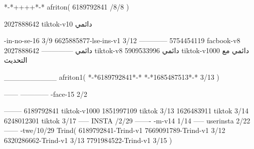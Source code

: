 *-*++++*-*
afriton(
6189792841 /8/8
)

2027888642 tiktok-v10
دائمي

-in-no-se-16 3/9
6625885877-lse-ins-v1 3/12
------------
5754454119 facbook-v8
دائمي
--------------
2027888642 tiktok-v8
دائمي
5909533996 tiktok-v1000
دائمي مع التحديث

__________
afriton1(
*-*6189792841*-*
*-*1685487513*-* 3/13
)


------
------------
-face-15 2/2

--------
6189792841 tiktok-v1000
1851997109 tiktok 3/13
1626483911 tiktok 3/14
6248012301 tiktok 3/17
-----
 INSTA /2/29
-------
-m-v14 1/14
-----
userinsta 2/22
------
-twe/10/29
Trind(
6189792841-Trind-v1 
7669091789-Trind-v1 3/12
6320286662-Trind-v1 3/13
7791984522-Trind-v1 3/15
)

